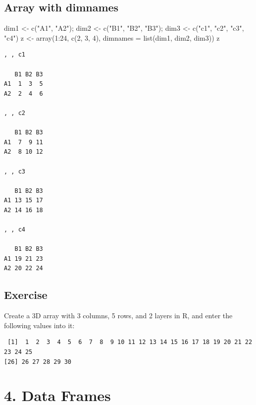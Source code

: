 \documentclass[
  letterpaper,
  DIV=11,
  numbers=noendperiod]{scrreprt}
\newenvironment{Shaded}{\begin{snugshade}}{\end{snugshade}}
\newcommand{\AttributeTok}[1]{\textcolor[rgb]{0.40,0.45,0.13}{#1}}
\newcommand{\DecValTok}[1]{\textcolor[rgb]{0.68,0.00,0.00}{#1}}
\newcommand{\FunctionTok}[1]{\textcolor[rgb]{0.28,0.35,0.67}{#1}}
\newcommand{\NormalTok}[1]{\textcolor[rgb]{0.00,0.23,0.31}{#1}}
\newcommand{\OtherTok}[1]{\textcolor[rgb]{0.00,0.23,0.31}{#1}}
\newcommand{\SpecialCharTok}[1]{\textcolor[rgb]{0.37,0.37,0.37}{#1}}
\newcommand{\StringTok}[1]{\textcolor[rgb]{0.13,0.47,0.30}{#1}}
\begin{document}
\subsection{Array with dimnames}\label{array-with-dimnames}

\begin{Shaded}
\begin{Highlighting}[]
\NormalTok{dim1 }\OtherTok{\textless{}{-}} \FunctionTok{c}\NormalTok{(}\StringTok{"A1"}\NormalTok{, }\StringTok{"A2"}\NormalTok{); dim2 }\OtherTok{\textless{}{-}} \FunctionTok{c}\NormalTok{(}\StringTok{"B1"}\NormalTok{, }\StringTok{"B2"}\NormalTok{, }\StringTok{"B3"}\NormalTok{); dim3 }\OtherTok{\textless{}{-}} \FunctionTok{c}\NormalTok{(}\StringTok{"c1"}\NormalTok{, }\StringTok{"c2"}\NormalTok{, }\StringTok{"c3"}\NormalTok{, }\StringTok{"c4"}\NormalTok{)}
\NormalTok{z }\OtherTok{\textless{}{-}} \FunctionTok{array}\NormalTok{(}\DecValTok{1}\SpecialCharTok{:}\DecValTok{24}\NormalTok{, }\FunctionTok{c}\NormalTok{(}\DecValTok{2}\NormalTok{, }\DecValTok{3}\NormalTok{, }\DecValTok{4}\NormalTok{), }\AttributeTok{dimnames =} \FunctionTok{list}\NormalTok{(dim1, dim2, dim3))}
\NormalTok{z}
\end{Highlighting}
\end{Shaded}

\begin{verbatim}
, , c1

   B1 B2 B3
A1  1  3  5
A2  2  4  6

, , c2

   B1 B2 B3
A1  7  9 11
A2  8 10 12

, , c3

   B1 B2 B3
A1 13 15 17
A2 14 16 18

, , c4

   B1 B2 B3
A1 19 21 23
A2 20 22 24
\end{verbatim}

\subsection{Exercise}\label{exercise-4}

Create a 3D array with 3 columns, 5 rows, and 2 layers in R, and enter
the following values into it:

\begin{verbatim}
 [1]  1  2  3  4  5  6  7  8  9 10 11 12 13 14 15 16 17 18 19 20 21 22 23 24 25
[26] 26 27 28 29 30
\end{verbatim}

\section{4. Data Frames}\label{data-frames}
\end{document}
